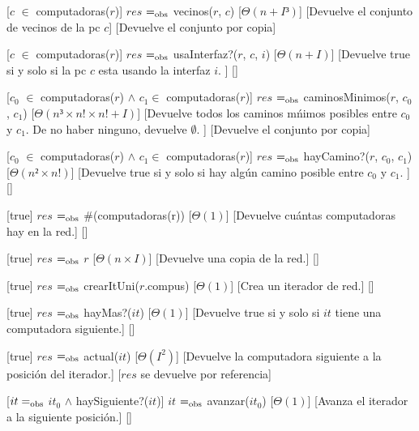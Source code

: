 \begin{Interfaz}
  [$c$ $\in$ computadoras($r$)]%
  {$res$ $=_{\mathrm{obs}}$ vecinos($r$, $c$)}%
  [$\Theta(n+I³)$]%
  [Devuelve el conjunto de vecinos de la pc $c$]%
  [Devuelve el conjunto por copia]%
  
  [$c$ $\in$ computadoras($r$)]%
  {$res$ $=_{\mathrm{obs}}$ usaInterfaz?($r$, $c$, $i$)}%
  [$\Theta(n+I)$]%
  [Devuelve true si y solo si la pc $c$ esta usando la interfaz $i$. ]%
  []%
  
  [$c_{0}$ $\in$ computadoras($r$) $\land$ $c_{1} \in $ computadoras($r$)]%
  {$res$ $=_{\mathrm{obs}}$ caminosMinimos($r$, $c_{0}$, $c_{1}$)}%
  [$\Theta(n³ \times n! \times n! + I)$]%
  [Devuelve todos los caminos m\'nimos posibles entre $c_{0}$ y $c_{1}$. De no haber ninguno, devuelve $\emptyset$. ]%
  [Devuelve el conjunto por copia]%
  
  [$c_{0}$ $\in$ computadoras($r$) $\land$ $c_{1} \in $ computadoras($r$)]%
  {$res$ $=_{\mathrm{obs}}$ hayCamino?($r$, $c_{0}$, $c_{1}$)}%
  [$\Theta(n² \times n!)$]%
  [Devuelve true si y solo si hay alg\'un camino posible entre $c_{0}$ y $c_{1}$. ]%
  []%
  
  [true]%
  {$res$ $=_{\mathrm{obs}}$ \#(computadoras(r))}%
  [$\Theta(1)$]%
  [Devuelve cu\'antas computadoras hay en la red.]%
  []%

  [true]%
  {$res$ $=_{\mathrm{obs}}$ $r$}%
  [$\Theta(n \times I)$]%
  [Devuelve una copia de la red.]%
  []%


  [true]%
  {$res$ $=_{\mathrm{obs}}$ crearItUni($r$.compus)}%
  [$\Theta(1)$]%
  [Crea un iterador de red.]%
  []%

  [true]%
  {$res$ $=_{\mathrm{obs}}$ hayMas?($it$)}%
  [$\Theta(1)$]%
  [Devuelve true si y solo si $it$ tiene una computadora siguiente.]%
  []%

  [true]%
  {$res$ $=_{\mathrm{obs}}$ actual($it$)}%
  [$\Theta(I^2)$]%
  [Devuelve la computadora siguiente a la posici\'on del iterador.]%
  [$res$ se devuelve por referencia]%

  [$it =_{\mathrm{obs}}$ $it_{0}$ $\land$ haySiguiente?($it$)]%
  {$it$ $=_{\mathrm{obs}}$ avanzar($it_{0}$)}%
  [$\Theta(1)$]%
  [Avanza el iterador a la siguiente posici\'on.]%
  []%
  

\end{Interfaz}

